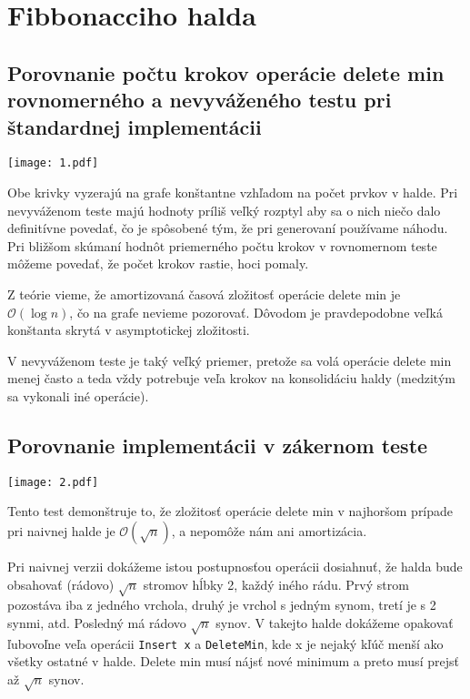 \documentclass[12pt,a4paper]{article}
\title{}
\author{}
\begin{document}
	\pagestyle{empty}
\section{Fibbonacciho halda}

\subsection{Porovnanie počtu krokov operácie delete min rovnomerného a nevyváženého testu pri štandardnej implementácii}

\texttt{[image: 1.pdf]}

Obe krivky vyzerajú na grafe konštantne vzhľadom na počet prvkov v halde. Pri nevyváženom teste majú hodnoty príliš veľký rozptyl aby sa o nich niečo dalo definitívne povedať, čo je spôsobené tým, že pri generovaní používame náhodu. Pri bližšom skúmaní hodnôt priemerného počtu krokov v rovnomernom teste môžeme povedať, že počet krokov rastie, hoci pomaly.

Z teórie vieme, že amortizovaná časová zložitosť operácie delete min je $\mathcal{O}(\log{}n)$, čo na grafe nevieme pozorovať. Dôvodom je pravdepodobne veľká konštanta skrytá v asymptotickej zložitosti.

V nevyváženom teste je taký veľký priemer, pretože sa volá operácie delete min menej často a teda vždy potrebuje veľa krokov na konsolidáciu haldy (medzitým sa vykonali iné operácie).

\subsection{Porovnanie implementácii v zákernom teste}

\texttt{[image: 2.pdf]}

Tento test demonštruje to, že zložitosť operácie delete min v najhoršom prípade pri naivnej halde je $\mathcal{O}(\sqrt{n})$, a nepomôže nám ani amortizácia.

Pri naivnej verzii dokážeme istou postupnosťou operácii dosiahnuť, že halda bude obsahovať (rádovo) $\sqrt{n}$ stromov hĺbky 2, každý iného rádu. Prvý strom pozostáva iba z jedného vrchola, druhý je vrchol s jedným synom, tretí je s 2 synmi, atd. Posledný má rádovo $\sqrt{n}$ synov. V takejto halde dokážeme opakovať ľubovoľne veľa operácii \texttt{Insert x} a \texttt{DeleteMin}, kde x je nejaký kľúč menší ako všetky ostatné v halde. Delete min musí nájsť nové minimum a preto musí prejsť až $\sqrt{n}$ synov.
\end{document}

